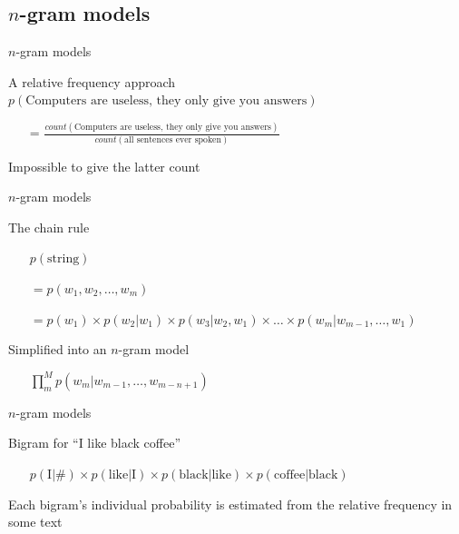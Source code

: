\documentclass{beamer}
\begin{document}
    \newcommand{\subtwo}{$n$-gram models}
    \subsection{\subtwo}
      \begin{frame}{\subtwo}
        \begin{block}{A relative frequency approach}
          $p ( \text{Computers are useless, they only give you answers} )$
          \begin{itemize}
            \item[=] $\frac{count(\text{Computers are useless, they only give you answers})}
                        {count(\text{all sentences ever spoken})} $
          \end{itemize}
        \end{block}
        \begin{alertblock}{}
          Impossible to give the latter count
        \end{alertblock}
      \end{frame}

      \begin{frame}{\subtwo}
        \begin{block}{The chain rule}
          {\small
            \begin{itemize}
              \item[] $p ( \text{string} )$
              \item[] $= p ( w_1, w_2, \ldots, w_m )$
              \item[] $= p ( w_1 ) \times p ( w_2 | w_1 ) \times p ( w_3 | w_2, w_1 ) \times \ldots \times p ( w_m | w_{m-1}, \ldots, w_1 )$
            \end{itemize}
          }
        \end{block}

        \begin{block}{Simplified into an $n$-gram model}
          {\small
            \begin{itemize}
              \item[] $\prod_m^M{ p ( w_m | w_{m-1}, \ldots, w_{m-n+1} ) }$
            \end{itemize}
          }
        \end{block}
      \end{frame}

      \begin{frame}{\subtwo}
        \begin{block}{Bigram for ``I like black coffee''}
          {\small
            \begin{itemize}
              \item[] $p ( \text{I} | \# ) \times p ( \text{like} | \text{I} ) \times p ( \text{black} | \text{like} ) \times p ( \text{coffee} | \text{black} )$
            \end{itemize}
          }
        \end{block}

        \begin{block}{}
          Each bigram's individual probability is estimated from the relative frequency in some text
        \end{block}
      \end{frame}
\end{document}
